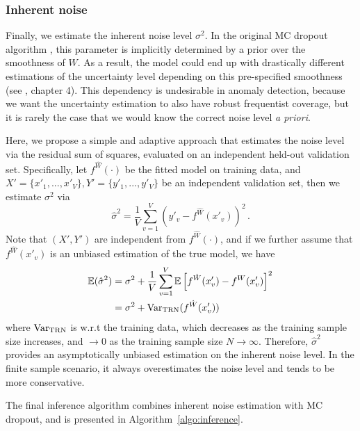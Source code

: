 \documentclass[conference,compsoc,final]{IEEEtran}
\begin{document}
\subsubsection{Inherent noise}
Finally, we estimate the inherent noise level $\sigma^2$. In the original MC dropout algorithm \cite{gal2016dropout}, this parameter is implicitly determined by a prior over the smoothness of $W$. As a result, the model could end up with drastically different estimations of the uncertainty level depending on this pre-specified smoothness (see \cite{gal2016uncertainty}, chapter 4). This dependency is undesirable in anomaly detection, because we want the uncertainty estimation to also have robust frequentist coverage, but it is rarely the case that we would know the correct noise level {\it a priori}.

Here, we propose a simple and adaptive approach that estimates the noise level via the residual sum of squares, evaluated on an independent held-out validation set. Specifically, let $f^{\hat{W}}(\cdot)$ be the fitted model on training data, and $X'=\{x'_1, ..., x'_V\}, Y'=\{y'_1, ..., y'_V\}$ be an independent validation set, then we estimate $\sigma^2$ via
\begin{equation} 
\hat{\sigma}^2 = \frac{1}{V} \sum_{v=1}^V \left( y'_v - f^{\hat{W}}(x'_v) \right)^2 \,.
\end{equation}
Note that $(X', Y')$ are independent from $f^{\hat{W}}(\cdot)$, 
and if we further assume that $f^{\hat{W}}(x'_v)$ is an unbiased estimation of the true model, we have 
\begin{equation}
\begin{split}
\mathbb{E}(\hat{\sigma}^2) &=
\sigma^2 +   \frac{1}{V} \sum_{v=1}^V \mathbb{E} \left[ f^{\hat{W}}(x'_v) - f^{W}(x'_v) \right]^2 \\
&= \sigma^2 +   \textrm{Var}_{\rm TRN}(f^{\hat{W}}(x'_v))  
\end{split}
\end{equation}
where $\textrm{Var}_{\rm TRN}$ is w.r.t the training data, which decreases as the training sample size increases, and $\to 0$ as the training sample size $N \to \infty$. Therefore, $\hat{\sigma}^2$ provides an asymptotically unbiased estimation on the inherent noise level. In the finite sample scenario, it always overestimates the noise level and tends to be more conservative.

The final inference algorithm combines inherent noise estimation with MC dropout, and is presented in Algorithm~\ref{algo:inference}.
\end{document}
